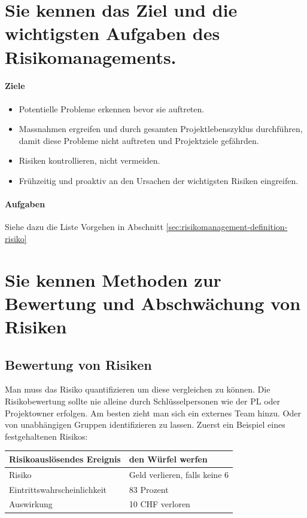 \section{Sie kennen das Ziel und die wichtigsten Aufgaben des Risikomanagements.}

\paragraph{Ziele}
\begin{itemize}
	\item Potentielle Probleme erkennen bevor sie auftreten.
	\item Massnahmen ergreifen und durch gesamten Projektlebenszyklus durchführen, damit diese Probleme nicht auftreten und Projektziele gefährden.
	\item Risiken kontrollieren, nicht vermeiden.
	\item Frühzeitig und proaktiv an den Ursachen der wichtigsten Risiken eingreifen.
\end{itemize}

\paragraph{Aufgaben}
Siehe dazu die Liste Vorgehen in Abschnitt \ref{sec:risikomanagement-definition-risiko}


\section{Sie kennen Methoden zur Bewertung und Abschwächung von Risiken}

\subsection{Bewertung von Risiken}

Man muss das Risiko quantifizieren um diese vergleichen zu können. Die Risikobewertung sollte nie alleine durch Schlüsselpersonen wie der PL oder Projektowner erfolgen. Am besten zieht man sich ein externes Team hinzu. Oder von unabhängigen Gruppen identifizieren zu lassen. Zuerst ein Beispiel eines festgehaltenen Risikos:

\begin{table}[h!]
	\centering
	\begin{tabular}{|p{7cm}|p{7cm}|}
		\hline Risikoauslösendes Ereignis &  den Würfel werfen \\ 
		\hline Risiko & Geld verlieren, falls keine 6  \\ 
		\hline Eintrittswahrscheinlichkeit & 83 Prozent \\ 
		\hline Auswirkung & 10 CHF verloren \\ 
		\hline 
	\end{tabular}
\end{table}


